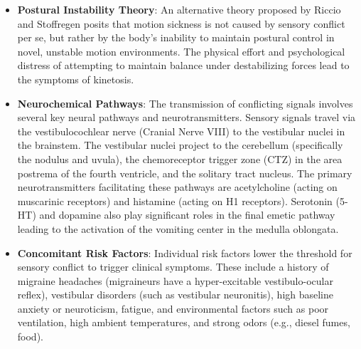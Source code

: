 \begin{itemize}
    \item \textbf{Postural Instability Theory}: An alternative theory proposed by Riccio and Stoffregen posits that motion sickness is not caused by sensory conflict per se, but rather by the body's inability to maintain postural control in novel, unstable motion environments. The physical effort and psychological distress of attempting to maintain balance under destabilizing forces lead to the symptoms of kinetosis.
    \item \textbf{Neurochemical Pathways}: The transmission of conflicting signals involves several key neural pathways and neurotransmitters. Sensory signals travel via the vestibulocochlear nerve (Cranial Nerve VIII) to the vestibular nuclei in the brainstem. The vestibular nuclei project to the cerebellum (specifically the nodulus and uvula), the chemoreceptor trigger zone (CTZ) in the area postrema of the fourth ventricle, and the solitary tract nucleus. The primary neurotransmitters facilitating these pathways are acetylcholine (acting on muscarinic receptors) and histamine (acting on H1 receptors). Serotonin (5-HT) and dopamine also play significant roles in the final emetic pathway leading to the activation of the vomiting center in the medulla oblongata.
    \item \textbf{Concomitant Risk Factors}: Individual risk factors lower the threshold for sensory conflict to trigger clinical symptoms. These include a history of migraine headaches (migraineurs have a hyper-excitable vestibulo-ocular reflex), vestibular disorders (such as vestibular neuronitis), high baseline anxiety or neuroticism, fatigue, and environmental factors such as poor ventilation, high ambient temperatures, and strong odors (e.g., diesel fumes, food).
\end{itemize}

